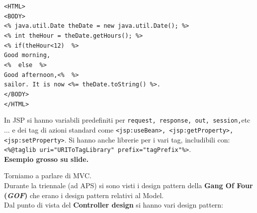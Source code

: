 \documentclass[a4paper,12pt, oneside]{book}
\begin{document}
\begin{shaded}
\begin{esempio}
    \texttt{<HTML>\\
      <BODY>\\
      <\% java.util.Date theDate = new java.util.Date(); \%>\\
      <\% int theHour = theDate.getHours(); \%>\\
      <\% if(theHour<12) { \%>\\
        Good morning,\\
        <\% } else { \%>\\
        Good afternoon,<\% } \%>\\
      sailor. It is now <\%= theDate.toString() \%>.\\
      </BODY>\\
      </HTML>}
  \end{esempio}
  In JSP si hanno variabili predefiniti per \texttt{request, response, out,
    session,}etc$\ldots$ e dei tag di azioni standard come
  \texttt{<jsp:useBean>, <jsp:getProperty>, <jsp:setProperty>}. Si hanno anche
  librerie per i vari tag, includibili con:
  \texttt{<\%@taglib uri="URIToTagLibrary" prefix="tagPrefix"\%>}.\\
  \textbf{Esempio grosso su slide.}
\end{shaded}
Torniamo a parlare di MVC.\\
Durante la triennale (ad APS) si sono visti i design pattern della \textbf{Gang
  Of Four (\textit{GOF})} che erano i design pattern relativi al Model.\\
Dal punto di vista del \textbf{Controller design} si hanno vari design pattern:
\end{document}
